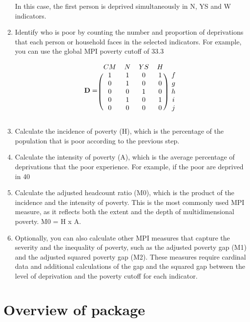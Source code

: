 \begin{enumerate}
In this case, the first person is deprived simultaneously in N, YS and W indicators.

\item Identify who is poor by counting the number and proportion of deprivations that each person or household faces in the selected indicators. For example, you can use the global MPI poverty cutoff of 33.3%

\[ \mathbf{D} = 
\begin{blockarray}{ccccc}
CM & N & YS & H \\
\begin{block}{(cccc)c}
  1 & 1 & 0 & 1 & f \\
  0 & 1 & 0 & 0 & g \\
  0 & 0 & 1 & 0 & h \\
  0 & 1 & 0 & 1 & i \\
  0 & 0 & 0 & 0 & j \\
\end{block}
\end{blockarray}
\]
\item Calculate the incidence of poverty (H), which is the percentage of the population that is poor according to the previous step.
\item Calculate the intensity of poverty (A), which is the average percentage of deprivations that the poor experience. For example, if the poor are deprived in 40%
\item Calculate the adjusted headcount ratio (M0), which is the product of the incidence and the intensity of poverty. This is the most commonly used MPI measure, as it reflects both the extent and the depth of multidimensional poverty. M0 = H x A.
\item Optionally, you can also calculate other MPI measures that capture the severity and the inequality of poverty, such as the adjusted poverty gap (M1) and the adjusted squared poverty gap (M2). These measures require cardinal data and additional calculations of the gap and the squared gap between the level of deprivation and the poverty cutoff for each indicator.
\end{enumerate}

\hypertarget{overview-of-package}{%
\section{\texorpdfstring{Overview of  package}{Overview of  package}}\label{overview-of-package}}

